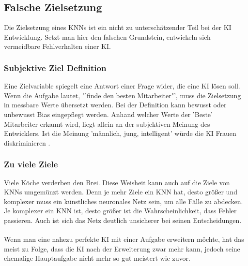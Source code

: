 \documentclass[12pt,oneside,a4paper,parskip]{scrbook}
\begin{document}
\subsection{Falsche Zielsetzung}
Die Zielsetzung eines KNNs ist ein nicht zu unterschätzender Teil bei der KI Entwicklung. Setzt man hier den falschen Grundstein, entwickeln sich vermeidbare Fehlverhalten einer KI.
\subsubsection{Subjektive Ziel Definition}
Eine Zielvariable spiegelt eine Antwort einer Frage wider, die eine KI lösen soll. Wenn die Aufgabe lautet, "'finde den besten Mitarbeiter"', muss die Zielsetzung in messbare Werte übersetzt werden. Bei der Definition kann bewusst oder unbewusst Bias eingepflegt werden. Anhand welcher Werte der 'Beste' Mitarbeiter erkannt wird, liegt allein an der subjektiven Meinung des Entwicklers. Ist die Meinung 'männlich, jung, intelligent' würde die KI Frauen diskriminieren \cite{KIPediaBias}.

\subsubsection{Zu viele Ziele}
Viele Köche verderben den Brei. Diese Weisheit kann auch auf die Ziele von KNNs umgemünzt werden. Denn je mehr Ziele ein KNN hat, desto größer und komplexer muss ein künstliches neuronales Netz sein, um alle Fälle zu abdecken. Je komplexer ein KNN ist, desto größer ist die Wahrscheinlichkeit, dass Fehler passieren. Auch ist sich das Netz deutlich unsicherer bei seinen Entscheidungen.
\\\\ %
Wenn man eine nahezu perfekte KI mit einer Aufgabe erweitern möchte, hat das meist zu Folge, dass die KI nach der Erweiterung zwar mehr kann, jedoch seine ehemalige Hauptaufgabe nicht mehr so gut meistert wie zuvor.
\end{document}
